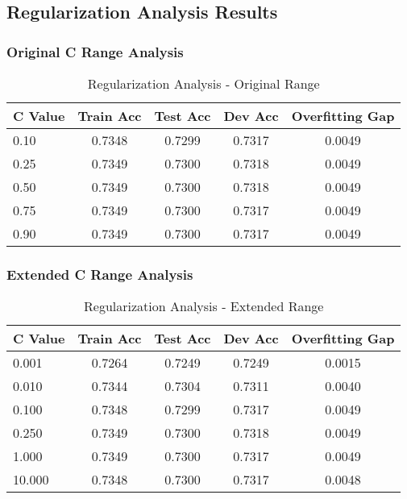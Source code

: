 \documentclass[12pt,a4paper]{article}
\begin{document}
\subsection{Regularization Analysis Results}

\subsubsection{Original C Range Analysis}
\begin{table}[H]
\centering
\caption{Regularization Analysis - Original Range}
\begin{tabular}{@{}lcccc@{}}
\toprule
\textbf{C Value} & \textbf{Train Acc} & \textbf{Test Acc} & \textbf{Dev Acc} & \textbf{Overfitting Gap} \\
\midrule
0.10 & 0.7348 & 0.7299 & 0.7317 & 0.0049 \\
0.25 & 0.7349 & 0.7300 & 0.7318 & 0.0049 \\
0.50 & 0.7349 & 0.7300 & 0.7318 & 0.0049 \\
0.75 & 0.7349 & 0.7300 & 0.7317 & 0.0049 \\
0.90 & 0.7349 & 0.7300 & 0.7317 & 0.0049 \\
\bottomrule
\end{tabular}
\end{table}

\subsubsection{Extended C Range Analysis}
\begin{table}[H]
\centering
\caption{Regularization Analysis - Extended Range}
\begin{tabular}{@{}lcccc@{}}
\toprule
\textbf{C Value} & \textbf{Train Acc} & \textbf{Test Acc} & \textbf{Dev Acc} & \textbf{Overfitting Gap} \\
\midrule
0.001 & 0.7264 & 0.7249 & 0.7249 & 0.0015 \\
0.010 & 0.7344 & 0.7304 & 0.7311 & 0.0040 \\
0.100 & 0.7348 & 0.7299 & 0.7317 & 0.0049 \\
0.250 & 0.7349 & 0.7300 & 0.7318 & 0.0049 \\
1.000 & 0.7349 & 0.7300 & 0.7317 & 0.0049 \\
10.000 & 0.7348 & 0.7300 & 0.7317 & 0.0048 \\
\bottomrule
\end{tabular}
\end{table}
\end{document}
